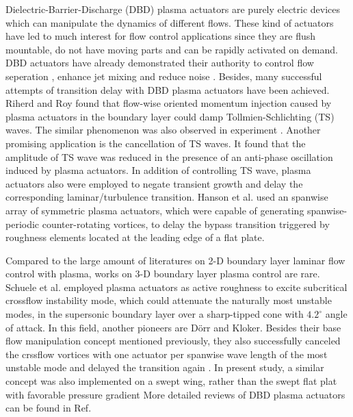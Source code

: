 \documentclass{AIAA}
\begin{document}
Dielectric-Barrier-Discharge (DBD) plasma actuators are purely electric devices which can manipulate the dynamics of different flows. These kind of actuators have led to much interest for flow control applications since they are flush mountable, do not have moving parts and can be rapidly activated on demand. DBD actuators have already demonstrated their authority to control flow seperation \cite{Little2010,Mclaughlin2006,Benard2011,Kelley2012,Schneck2014,Jukes2009}, enhance jet mixing \cite{Benard2008} and reduce noise \cite{Thomas2008}. Besides, many successful attempts of transition delay with DBD plasma actuators have been achieved. Riherd and Roy \cite{Riherd2013} found that flow-wise oriented momentum injection caused by plasma actuators in the boundary layer could damp Tollmien-Schlichting (TS) waves. The similar phenomenon was also observed in experiment \cite{Duchmann2014,Grundmann2007a}. Another promising application is the cancellation of TS waves\cite{Grundmann2008,Kurz2014,Kotsonis2013}. It found that the amplitude of TS wave was reduced in the presence of an anti-phase oscillation induced by plasma actuators. In addition of controlling TS wave, plasma actuators also were employed to negate transient growth and delay the corresponding laminar/turbulence transition. Hanson et al. \cite{Hanson2010,Hanson2014} used an spanwise array of symmetric plasma actuators, which were capable of generating spanwise-periodic counter-rotating vortices, to delay the bypass transition triggered by roughness elements located at the leading edge of a flat plate.

Compared to the large amount of literatures on 2-D boundary layer laminar flow control with plasma, works on 3-D boundary layer plasma control are rare. Schuele et al. \cite{schuele2013control} employed plasma actuators as active roughness to excite subcritical crossflow instability mode, which could attenuate the naturally most unstable modes, in the supersonic boundary layer over a sharp-tipped cone with $4.2^{\circ}$ angle of attack. In this field, another pioneers are D\"orr and Kloker. Besides their base flow manipulation concept mentioned previously, they also successfully canceled the crssflow vortices with one actuator per spanwise wave length of the most unstable mode and delayed the transition again \cite{dorr2016}. In present study, a similar concept was also implemented on a swept wing, rather than the swept flat plat with favorable pressure gradient%
 More detailed reviews of DBD plasma actuators can be found in Ref.\cite{Moreau2007,Corke2010,Benard2014}
\end{document}

